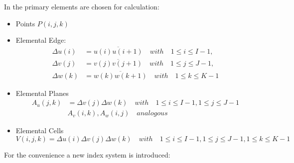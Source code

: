 In \cite{script_FeldSim} the primary elements are chosen for calculation:
\begin{itemize}
\item Points $P(i,j,k)$
\item Elemental Edge:
    \begin{align}
		\Delta u(i)&=\overline{u(i)u(i+1)}  \quad with  \quad 1\leq i \leq I-1, \nonumber\\
		\Delta v(j)&=\overline{v(j)v(j+1)}  \quad with  \quad 1\leq j \leq J-1, \nonumber\\
		\Delta w(k)&=\overline{w(k)w(k+1)}  \quad with  \quad 1\leq k \leq K-1
		\label{eq:discrete_edge}
		\end{align}
\item Elemental Planes
		\begin{align}
		A_{u}(j,k)&=\Delta v(j)\Delta w(k) \quad with  \quad 1\leq i \leq I-1,1\leq j \leq J-1\nonumber\\
		&A_{v}(i,k),A_{w}(i,j)  \quad analogous
		\label{eq:discrete_plane}
		\end{align}
\item Elemental Cells
		\begin{equation}
		V(i,j,k)=\Delta u(i)\Delta v(j)\Delta w(k)  \quad with  \quad 1\leq i\leq I-1,1\leq j\leq J-1,1\leq k\leq K-1
		\label{eq:discrete_cell}
		\end{equation}
\end{itemize}
For the convenience a new index system is introduced:

